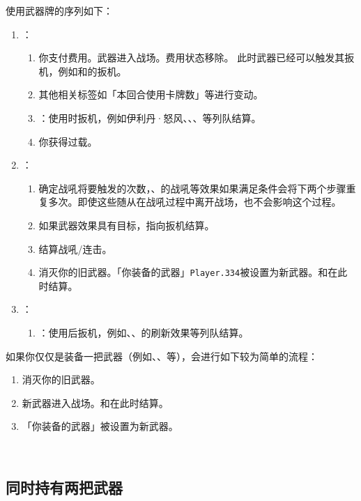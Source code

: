 使用武器牌的序列如下：
\begin{enumerate}
    \item {}：
    \begin{enumerate}
        \item 你支付费用。武器进入战场。费用状态移除。
            \notice 此时武器已经可以触发其扳机，例如和的扳机。
        \item 其他相关标签如「本回合使用卡牌数」等进行变动。
        \item {}：使用时扳机，例如伊利丹·怒风、、、等列队结算。
        \item 你获得过载。
    \end{enumerate}

    \item {}：
    \begin{enumerate}
        \item 确定战吼将要触发的次数，、的战吼等效果如果满足条件会将下两个步骤重复多次。即使这些随从在战吼过程中离开战场，也不会影响这个过程。
        \item 如果武器效果具有目标，指向扳机结算。
        \item 结算战吼/连击。
        \item 消灭你的旧武器。「你装备的武器」\texttt{Player.334}被设置为新武器。和在此时结算。
    \end{enumerate}

    \item {}：
    \begin{enumerate}
        \item {}：使用后扳机，例如、、的刷新效果等列队结算。
    \end{enumerate}
\end{enumerate}
​
如果你仅仅是装备一把武器（例如、、等），会进行如下较为简单的流程：
\begin{enumerate}
    \item 消灭你的旧武器。
    \item 新武器进入战场。和在此时结算。
    \item 「你装备的武器」被设置为新武器。
\end{enumerate}
​
\subsection{同时持有两把武器}

